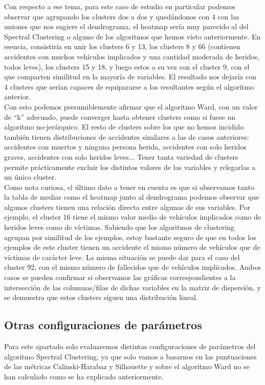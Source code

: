 	Con respecto a ese tema, para este caso de estudio en particular podemos observar que agrupando los clusters dos a dos y quedándonos con 4 con las uniones que nos sugiere el dendrograma, el heatmap sería muy parecido al del Spectral Clustering o alguno de los algoritmos que hemos visto anteriormente. En esencia, consistiría en unir los clusters 6 y 13, los clusters 8 y 66 (contienen accidentes con muchos vehículos implicados y una cantidad moderada de heridos, todos leves), los clusters 15 y 18, y luego estos a su vez con el cluster 9, con el que comparten similitud en la mayoría de variables. El resultado nos dejaría con 4 clusters que serían capaces de equipararse a los resultantes según el algoritmo anterior.\\
	
	Con esto podemos presumiblemente afirmar que el algoritmo Ward, con un valor de ``k'' adecuado, puede converger hasta obtener clusters como si fuese un algoritmo no-jerárquico. El resto de clusters sobre los que no hemos incidido también tienen distribuciones de accidentes similares a las de casos anteriores: accidentes con muertos y ninguna persona herida, accidentes con solo heridos graves, accidentes con solo heridos leves... Tener tanta variedad de clusters permite prácticamente excluir los distintos valores de las variables y relegarlas a un único cluster.\\
	
	Como nota curiosa, el último dato a tener en cuenta es que si observamos tanto la tabla de medias como el heatmap junto al dendrograma podemos observar que algunos clusters tienen una relación directa entre algunas de sus variables. Por ejemplo, el cluster 16 tiene el mismo valor medio de vehículos implicados como de heridos leves como de víctimas. Sabiendo que los algoritmos de clustering agrupan por similitud de los ejemplos, estoy bastante seguro de que en todos los ejemplos de este cluster tienen un accidente el mismo número de vehículos que de víctimas de carácter leve. La misma situación se puede dar para el caso del cluster 92, con el mismo número de fallecidos que de vehículos implicados. Ambos casos se pueden confirmar si observamos las gráficas correspondientes a la intersección de las columnas/filas de dichas variables en la matriz de dispersión, y se demuestra que estos clusters siguen una distribución lineal.

	\subsection{Otras configuraciones de parámetros}
	Para este apartado solo evaluaremos distintas configuraciones de parámetros del algoritmo Spectral Clustering, ya que solo vamos a basarnos en las puntuaciones de las métricas Calinski-Harabaz y Silhouette y sobre el algoritmo Ward no se han calculado como se ha explicado anteriormente.

